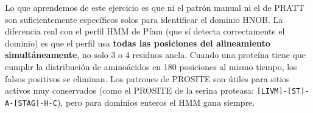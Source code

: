 Lo que aprendemos de este ejercicio es que ni el patrón manual ni el de PRATT son suficientemente
específicos solos para identificar el dominio HNOB. La diferencia real con el perfil HMM de Pfam
(que sí detecta correctamente el dominio) es que el perfil usa \textbf{todas las posiciones del
alineamiento simultáneamente}, no solo 3 o 4 residuos ancla. Cuando una proteína tiene que cumplir
la distribución de aminoácidos en 180 posiciones al mismo tiempo, los falsos positivos se eliminan.
Los patrones de PROSITE son útiles para sitios activos muy conservados (como el PROSITE de la
serina proteasa: \texttt{[LIVM]-[ST]-A-[STAG]-H-C}), pero para dominios enteros el HMM gana
siempre.

